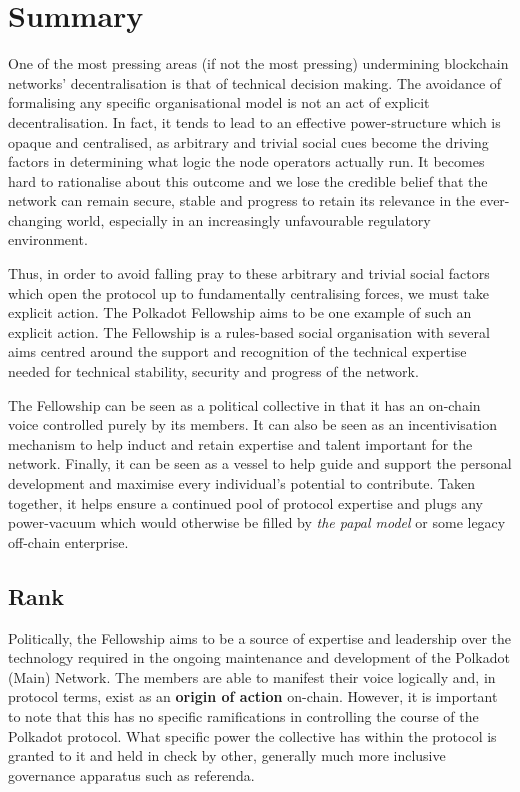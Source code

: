 \documentclass[9pt,oneside]{amsart}
\begin{document}
\section{Summary}\label{summary}

One of the most pressing areas (if not the most pressing) undermining blockchain networks' decentralisation is that of technical decision making. The avoidance of formalising any specific organisational model is not an act of explicit decentralisation. In fact, it tends to lead to an effective power-structure which is opaque and centralised, as arbitrary and trivial social cues become the driving factors in determining what logic the node operators actually run. It becomes hard to rationalise about this outcome and we lose the credible belief that the network can remain secure, stable and progress to retain its relevance in the ever-changing world, especially in an increasingly unfavourable regulatory environment.

Thus, in order to avoid falling pray to these arbitrary and trivial social factors which open the protocol up to fundamentally centralising forces, we must take explicit action. The Polkadot Fellowship aims to be one example of such an explicit action. The Fellowship is a rules-based social organisation with several aims centred around the support and recognition of the technical expertise needed for technical stability, security and progress of the network.

The Fellowship can be seen as a political collective in that it has an on-chain voice controlled purely by its members. It can also be seen as an incentivisation mechanism to help induct and retain expertise and talent important for the network. Finally, it can be seen as a vessel to help guide and support the personal development and maximise every individual's potential to contribute. Taken together, it helps ensure a continued pool of protocol expertise and plugs any power-vacuum which would otherwise be filled by \emph{the papal model} or some legacy off-chain enterprise.


\subsection{Rank}

Politically, the Fellowship aims to be a source of expertise and leadership over the technology required in the ongoing maintenance and development of the Polkadot (Main) Network. The members are able to manifest their voice logically and, in protocol terms, exist as an \textbf{origin of action} on-chain. However, it is important to note that this has no specific ramifications in controlling the course of the Polkadot protocol. What specific power the collective has within the protocol is granted to it and held in check by other, generally much more inclusive governance apparatus such as referenda.
\end{document}

